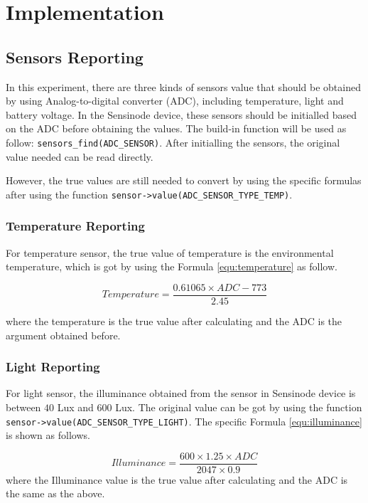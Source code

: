 \chapter{Implementation}
\label{chap:implementation}

\section{Sensors Reporting}

In this experiment, there are three kinds of sensors value that should be obtained by using Analog-to-digital converter (ADC), including temperature, light and battery voltage. 
In the Sensinode device, these sensors should be initialled based on the ADC before obtaining the values. The build-in function will be used as follow: \texttt{sensors\_find(ADC\_SENSOR)}. After initialling the sensors, the original value needed can be read directly. 

However, the true values are still needed to convert by using the specific formulas after using the function \texttt{sensor->value(ADC\_SENSOR\_TYPE\_TEMP)}. 

\subsection{Temperature Reporting}

For temperature sensor, the true value of temperature is the environmental temperature, which is got by using the Formula \ref{equ:temperature} as follow.

\begin{equation}
    Temperature = \frac{0.61065 \times ADC - 773}{2.45}
\label{equ:temperature}
\end{equation}

where the temperature is the true value after calculating and the ADC is the argument obtained before. 

\subsection{Light Reporting}

For light sensor, the illuminance obtained from the sensor in Sensinode device is between $40$ Lux and $600$ Lux. The original value can be got by using the function \\
\texttt{sensor->value(ADC\_SENSOR\_TYPE\_LIGHT)}. 
The specific Formula \ref{equ:illuminance} is shown as follows.

\begin{equation}
    Illuminance = 
    \frac{600 \times 1.25 \times ADC}{2047 \times 0.9}
\label{equ:illuminance}
\end{equation}
where the Illuminance value is the true value after calculating and the ADC is the same as the above.


